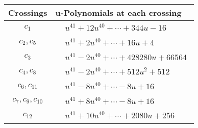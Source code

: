 \documentclass[1p]{elsarticle_modified}
\theoremstyle{definition}
\begin{document}
\begin{tabular}{m{50pt}|m{274pt}}
Crossings & \hspace{64pt}u-Polynomials at each crossing \\
\hline $$\begin{aligned}c_{1}\end{aligned}$$&$\begin{aligned}
&u^{41}+12 u^{40}+\cdots+344 u-16
\end{aligned}$\\
\hline $$\begin{aligned}c_{2},c_{5}\end{aligned}$$&$\begin{aligned}
&u^{41}+2 u^{40}+\cdots+16 u+4
\end{aligned}$\\
\hline $$\begin{aligned}c_{3}\end{aligned}$$&$\begin{aligned}
&u^{41}-2 u^{40}+\cdots+428280 u+66564
\end{aligned}$\\
\hline $$\begin{aligned}c_{4},c_{8}\end{aligned}$$&$\begin{aligned}
&u^{41}-2 u^{40}+\cdots+512 u^2+512
\end{aligned}$\\
\hline $$\begin{aligned}c_{6},c_{11}\end{aligned}$$&$\begin{aligned}
&u^{41}-8 u^{40}+\cdots-8 u+16
\end{aligned}$\\
\hline $$\begin{aligned}c_{7},c_{9},c_{10}\end{aligned}$$&$\begin{aligned}
&u^{41}+8 u^{40}+\cdots-8 u+16
\end{aligned}$\\
\hline $$\begin{aligned}c_{12}\end{aligned}$$&$\begin{aligned}
&u^{41}+10 u^{40}+\cdots+2080 u+256
\end{aligned}$\\
\hline
\end{tabular}\\~\\
\newpage\renewcommand{\arraystretch}{1}
\end{document}
